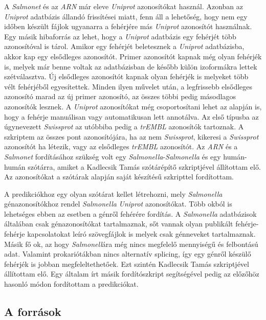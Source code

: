 \documentclass[a4paper,12pt]{article}
\begin{document}
			A \textit{Salmonet} és az \textit{ARN} már eleve \textit{Uniprot} azonosítókat használ. Azonban az \textit{Uniprot} adatbázis állandó frissítései miatt, fenn áll a lehetőség, hogy nem egy időben készült fájlok ugyanarra a fehérjére más \textit{Uniprot} azonosítót használnak. Egy másik hibaforrás az lehet, hogy a \textit{Uniprot} adatbázis egy fehérjét több azonosítóval is tárol. Amikor egy fehérjét beletesznek a \textit{Uniprot} adatbázisba, akkor kap egy elsődleges azonosítót. Primer azonosítót kapnak még olyan fehérjék is, melyek már benne voltak az adatbázisban de később külön izoformákra lettek szétválasztva. Új elsődleges azonosítót kapnak olyan fehérjék is melyeket több vélt fehérjéből egyesítettek. Minden ilyen művelet után, a legfrissebb elsődleges azonosító marad az új primer azonosító, az összes többi pedig másodlagos azonosítók lesznek. A \textit{Uniprot} azonosítókat még csoportosítani lehet az alapján is, hogy a fehérje manuálisan vagy automatikusan lett annotálva. Az első típusba az úgynevezett \textit{Swissprot} az utóbbiba pedig a \textit{trEMBL} azonosítók tartoznak. A szkriptem az összes pont azonosítójára, ha az nem \textit{Swissprot}, kikeresi a \textit{Swissprot} azonosítót ha létezik, vagy az elsődleges \textit{trEMBL} azonosítót. Az \textit{ARN} és a \textit{Salmonet} fordításához szükség volt egy \textit{Salmonella}-\textit{Salmonella} és egy humán-humán szótárra, amiket a Kadlecsik Tamás szótárépítő szkriptjével állítottam elő. Az azonosítókat a szótárak alapján saját készítésű szkripttel fordítottam.

			A predikciókhoz egy olyan szótárat kellet létrehozni, mely \textit{Salmonella} génazonosítókhoz rendel \textit{Salmonella} \textit{Uniprot} azonosítókat. Több okból is lehetséges ebben az esetben a génről fehérére fordítás. A \textit{Salmonella} adatbázisok általában csak génazonosítókat tartalmaznak, sőt vannak olyan publikált fehérje-fehérje kapcsolatokat leíró szövegfájlok is melyek csak génneveket tartalmaznak. Másik fő ok, az hogy \textit{Salmonell}ára még nincs megfelelő mennyiségű és felbontású adat. Valamint prokariótákban nincs alternatív splicing, így egy génről készülő fehérjék is jobban megfeleltethetőek. Ezt szintén Kadlecsik Tamás szkriptjével állítottam elő. Egy általam írt másik fordítószkript segítségével pedig az előzőhöz hasonló módon fordítottam a predikciókat.


		\subsection{A források}
\end{document}
